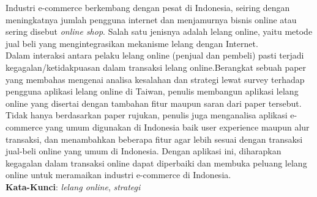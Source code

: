 \begin{abstrak}
	Industri e-commerce berkembang dengan pesat di Indonesia, seiring dengan meningkatnya jumlah pengguna internet dan menjamurnya bisnis online atau sering disebut \textit{online shop}. Salah satu jenisnya adalah lelang online, yaitu metode jual beli yang mengintegrasikan mekanisme lelang dengan Internet.\\
    \indent Dalam interaksi antara pelaku lelang online (penjual dan pembeli) pasti terjadi kegagalan/ketidakpuasan dalam transaksi lelang online.Berangkat sebuah paper yang membahas mengenai analisa kesalahan dan strategi lewat survey terhadap pengguna aplikasi lelang online di Taiwan, penulis membangun aplikasi lelang online yang disertai dengan tambahan fitur maupun saran dari paper tersebut. \\ 
    \indent Tidak hanya berdasarkan paper rujukan, penulis juga menganalisa aplikasi e-commerce yang umum digunakan di Indonesia baik user experience maupun alur transaksi, dan menambahkan beberapa fitur agar lebih sesuai dengan transaksi jual-beli online yang umum di Indonesia. Dengan aplikasi ini, diharapkan kegagalan dalam transaksi online dapat diperbaiki dan membuka peluang lelang online untuk meramaikan industri e-commerce di Indonesia.\\
\noindent \textbf{Kata-Kunci}: \textit{lelang online}, \textit{strategi }
\end{abstrak}